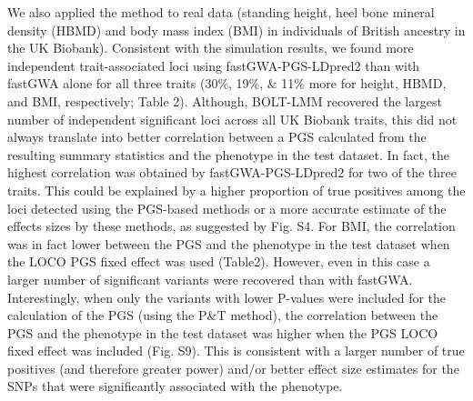 \documentclass[fleqn,10pt]{wlscirep}
\begin{document}
We also applied the method to real data (standing height, heel bone mineral density (HBMD) and body mass index (BMI) in individuals of British ancestry in the UK Biobank). Consistent with the simulation results, we found more independent trait-associated loci using fastGWA-PGS-LDpred2 than with fastGWA alone for all three traits (30\%, 19\%, \& 11\% more for height, HBMD, and BMI, respectively; Table 2). Although, BOLT-LMM recovered the largest number of independent significant loci across all UK Biobank traits, this did not always translate into better correlation between a PGS calculated from the resulting summary statistics and the phenotype in the test dataset. In fact, the highest correlation was obtained by fastGWA-PGS-LDpred2 for two of the three traits. This could be explained by a higher proportion of true positives among the loci detected using the PGS-based methods or a more accurate estimate of the effects sizes by these methods, as suggested by Fig. S4. For BMI, the correlation was in fact lower between the PGS and the phenotype in the test dataset when the LOCO PGS fixed effect was used (Table2). However, even in this case a larger number of significant variants were recovered than with fastGWA. Interestingly, when only the variants with lower P-values were included for the calculation of the PGS (using the P\&T method), the correlation between the PGS and the phenotype in the test dataset was higher when the PGS LOCO fixed effect was included (Fig. S9). This is consistent with a larger number of true positives (and therefore greater power) and/or better effect size estimates for the SNPs that were significantly associated with the phenotype. \par

\end{document}
